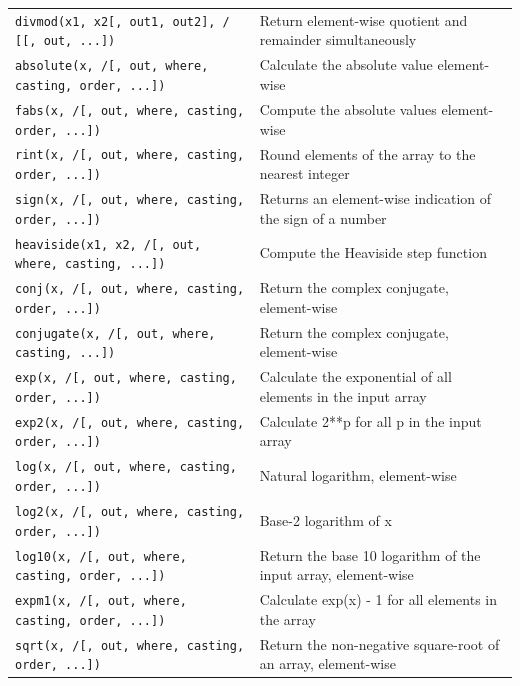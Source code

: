 \documentclass[a4paper,11pt]{book}
\begin{document}
\begin{appendices}
\begin{table}
\begin{tabular}{lp{13cm}}
\texttt{divmod(x1, x2[, out1, out2], / [[, out, ...])}& Return element-wise quotient and remainder simultaneously\\
\texttt{absolute(x, /[, out, where, casting, order, ...])}& Calculate the absolute value element-wise\\
\texttt{fabs(x, /[, out, where, casting, order, ...])}& Compute the absolute values element-wise\\
\texttt{rint(x, /[, out, where, casting, order, ...])}& Round elements of the array to the nearest integer\\
\texttt{sign(x, /[, out, where, casting, order, ...])}& Returns an element-wise indication of the sign of a number\\
\texttt{heaviside(x1, x2, /[, out, where, casting, ...])}& Compute the Heaviside step function\\
\texttt{conj(x, /[, out, where, casting, order, ...])}& Return the complex conjugate, element-wise\\
\texttt{conjugate(x, /[, out, where, casting, ...])}& Return the complex conjugate, element-wise\\
\texttt{exp(x, /[, out, where, casting, order, ...])}& Calculate the exponential of all elements in the input array\\
\texttt{exp2(x, /[, out, where, casting, order, ...])}& Calculate 2**p for all p in the input array\\
\texttt{log(x, /[, out, where, casting, order, ...])}& Natural logarithm, element-wise\\
\texttt{log2(x, /[, out, where, casting, order, ...])}& Base-2 logarithm of x\\
\texttt{log10(x, /[, out, where, casting, order, ...])}& Return the base 10 logarithm of the input array, element-wise\\
\texttt{expm1(x, /[, out, where, casting, order, ...])}& Calculate exp(x) - 1 for all elements in the array\\
\texttt{sqrt(x, /[, out, where, casting, order, ...])}& Return the non-negative square-root of an array, element-wise\\
\bottomrule
\end{tabular}
\end{table}
\clearpage


\end{appendices}
\end{document}
